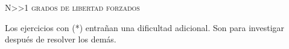 \documentclass[11pt, spanish, a4paper, twopage]{article}
\begin{document}
\begin{center}
	\textsc{\LARGE N\textgreater\textgreater1 grados de libertad forzados}
\end{center}

Los ejercicios con (*) entrañan una dificultad adicional. Son para investigar después de resolver los demás.


\begin{enumerate}

}

\end{enumerate}
\end{document}

